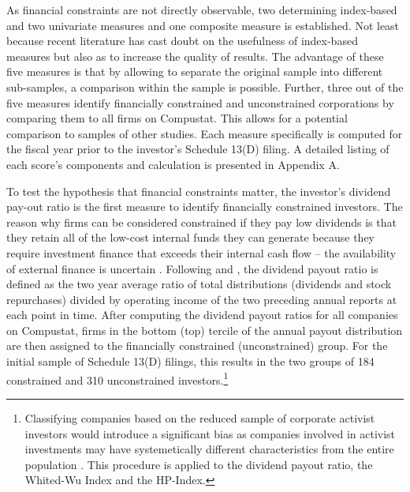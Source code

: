 \documentclass[12pt]{article}
\begin{document}
\noindent As financial constraints are not directly observable, two determining index-based and two univariate measures and one composite measure is established. Not least because recent literature has cast doubt on the usefulness \citep[p.109]{Khatami2014} of index-based measures but also as to increase the quality of results. The advantage of these five measures is that by allowing to separate the original sample into different sub-samples, a comparison within the sample is possible. Further, three out of the five measures identify financially constrained and unconstrained corporations by comparing them to all firms on Compustat. This allows for a potential comparison to samples of other studies. Each measure specifically is computed for the fiscal year prior to the investor's Schedule 13(D) filing. A detailed listing of each score's components and calculation is presented in Appendix A.\par
To test the hypothesis that financial constraints matter, the investor's dividend pay-out ratio is the first measure to identify financially constrained investors. The reason why firms can be considered constrained if they pay low dividends is that they retain all of the low-cost internal funds they can generate because they require investment finance that exceeds their internal cash flow  -- the availability of external finance is uncertain \citep[p.158]{Fazzari1988}. Following \citet{Almeida2004} and \citet[p.119]{Khatami2014}, the dividend payout ratio is defined as the two year average ratio of total distributions (dividends and stock repurchases) divided by operating income of the two preceding annual reports at each point in time. After computing the dividend payout ratios for all companies on Compustat, firms in the bottom (top) tercile of the annual payout distribution are then assigned to the financially constrained (unconstrained) group. For the initial sample of Schedule 13(D) filings, this results in the two groups of 184 constrained and 310 unconstrained investors.\footnote{Classifying companies based on the reduced sample of corporate activist investors would introduce a significant bias as companies involved in activist investments may have systemetically different characteristics from the entire population \citep[p.109]{Khatami2014}. This procedure is applied to the dividend payout ratio, the Whited-Wu Index and the HP-Index.}\par
\end{document}
